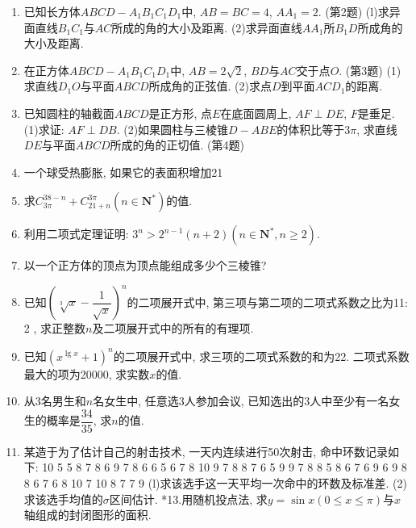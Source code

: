 \documentclass[10pt,a4paper]{article}
\newcommand{\blank}[1]{\underline{\hbox to #1pt{}}}
\begin{document}
\begin{enumerate}[1.]
(1)求$(1.009)^5$的近似值\blank{50}. (结果精确到0.001)
(2)设球的半径为4, 用一个平面截球, 使截面圆的半径为2, 则截面与球心的距离\blank{50}.
(3)4名男生、4名女生站站成一排, 男女间隔排列, 则不同的排法有\blank{50}种.
\item 已知长方体$ABCD-A_1B_1C_1D_1$中, $AB=BC=4$, $AA_1=2$.
(第2题)
(l)求异面直线$B_1C_1$与$AC$所成的角的大小及距离.
(2)求异面直线$AA_1$所$B_1D$所成角的大小及距离.
\item 在正方体$ABCD-A_1B_1C_1D_1$中, $AB=2\sqrt 2$, $BD$与$AC$交于点$O$.
(第3题)
(1)求直线$D_1O$与平面$ABCD$所成角的正弦值.
(2)求点$D$到平面$ACD_1$的距离.
\item 已知圆柱的轴截面$ABCD$是正方形, 点$E$在底面圆周上, $AF\perp DE$, $F$是垂足.
(1)求证: $AF\perp DB$.
(2)如果圆柱与三棱锥$D-ABE$的体积比等于$3\pi$, 求直线$DE$与平面$ABCD$所成的角的正切值.
(第4题)
\item 一个球受热膨胀, 如果它的表面积增加21%
\item 求$C_{3\pi }^{38-n}+C_{21+n}^{3\pi }(n\in \mathbf{N}^*)$的值.
\item 利用二项式定理证明: $3^n>2^{n-1}(n+2)(n\in \mathbf{N}^*,n\ge 2)$.
\item 以一个正方体的顶点为顶点能组成多少个三棱锥?
\item 已知$(\sqrt[3]x-\dfrac 1{\sqrt x})^n$的二项展开式中, 第三项与第二项的二项式系数之比为11: 2 , 求正整数$n$及二项展开式中的所有的有理项.
\item 已知$(x^{\lg x}+1)^n$的二项展开式中, 求三项的二项式系数的和为22. 二项式系数最大的项为20000, 求实数$x$的值.
\item 从3名男生和$n$名女生中, 任意选3人参加会议, 已知选出的3人中至少有一名女生的概率是$\dfrac{34}{35}$, 求$n$的值.
\item 某造于为了估计自己的射击技术, 一天内连续进行50次射击, 命中环数记录如下:
10	5	5	8	7	8	6	9	7	8
6	6	5	6	7	8	10	9	7	8
8	7	6	5	9	9	7	8	8	5
8	6	7	6	9	6	9	8	8	6
7	6	8	10	7	10	8	7	7	9
(l)求该选手这一天平均一次命中的环数及标准差.
(2)求该选手均值的$\sigma$区间估计.
*13.用随机投点法, 求$y=\sin x(0\le x\le \pi)$与$x$轴组成的封闭图形的面积.
    


\end{enumerate}
\end{document}
